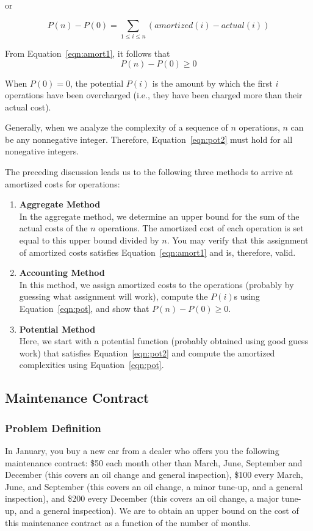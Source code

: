 or

$$P(n) - P(0) = \sum_{1 \leq i \leq n} (amortized(i) - actual(i))$$

From Equation~\ref{eqn:amort1}, it follows that
\begin{equation}\label{eqn:pot2}
P(n) - P(0) \geq 0
\end{equation}

When $P(0) = 0$, the potential
$P(i)$ is the amount by which the first
$i$ operations have been overcharged (i.e., they have
been charged more than their actual cost).

Generally, when we analyze the complexity of a sequence of $n$ operations, $n$
can be any nonnegative integer.
Therefore, Equation~\ref{eqn:pot2} must hold for all nonegative integers.

The preceding discussion leads us to the following three methods to arrive at
amortized costs for operations:

\begin{enumerate}
\item
{\bf Aggregate Method}\\
In the aggregate method, we determine an upper bound
for the sum
of the actual costs of the
$n$ operations.
The amortized cost of each operation is set equal to
this upper bound divided by $n$.
You may verify that this assignment of amortized costs
satisfies Equation~\ref{eqn:amort1} and is, therefore, valid.
\item
{\bf Accounting Method}\\
In this method, we assign amortized costs to the operations
(probably by guessing what assignment will work), compute
the $P(i)$s using Equation~\ref{eqn:pot}, and show
that $P(n)-P(0) \geq 0$.
\item
{\bf Potential Method}\\
Here, we start with a potential
function (probably obtained using good guess work)
that satisfies Equation~\ref{eqn:pot2}
and compute the amortized complexities
using Equation~\ref{eqn:pot}.
\end{enumerate}

\subsection{Maintenance Contract}
\subsubsection*{Problem Definition}
In January,
you buy a new car
from a dealer who offers you the following maintenance
contract: \$50 each month other than March, June,
September and
December (this covers an oil change and general inspection),
\$100 every March, June, and September
(this covers an oil change, a
minor tune-up, and a general inspection), and
\$200 every
December (this covers an oil change, a
major tune-up, and a general inspection).
We are to obtain an upper bound on the cost of this maintenance
contract as a function of the number of months.

